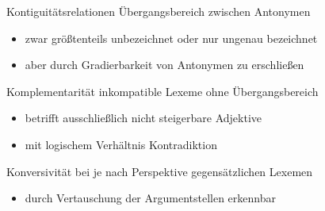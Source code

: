 \begin{frame}{Kontiguitätsrelationen}
\onslide<+->
Übergangsbereich zwischen Antonymen
\begin{itemize}[<+->]
	\item		zwar größtenteils unbezeichnet oder nur ungenau bezeichnet
	\item		aber durch Gradierbarkeit von Antonymen zu erschließen
\end{itemize}
\onslide<+->
\Zeile
\begin{exe}
	\ex\label{ex:antonymie-002}
    \begin{xlist}
		\onslide<+->
		\onslide<+->
	\end{xlist}
\end{exe}
\end{frame}

\begin{frame}{Komplementarität}
\onslide<+->
inkompatible Lexeme ohne Übergangsbereich
\begin{itemize}[<+->]
	\item		betrifft ausschließlich nicht steigerbare Adjektive
	\item		mit logischem Verhältnis Kontradiktion
\end{itemize}
\onslide<+->
\Zeile
\begin{exe}
	\ex\label{ex:komplementaritaet-001}
    \begin{xlist}
		\onslide<+->
		\onslide<+->
	\end{xlist}
\end{exe}
\end{frame}

\begin{frame}{Konversivität}
\onslide<+->
bei je nach Perspektive gegensätzlichen Lexemen
\begin{itemize}[<+->]
	\item		durch Vertauschung der Argumentstellen erkennbar
\end{itemize}
\onslide<+->
\Zeile
\begin{exe}
	\ex\label{ex:konversivitaet-001}
    \begin{xlist}
		\onslide<+->
	\end{xlist}
\end{exe}
\end{frame}

